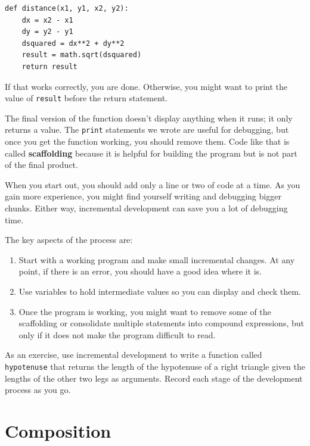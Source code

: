 \documentclass[10pt]{book}
\begin{document}
\begin{verbatim}
def distance(x1, y1, x2, y2):
    dx = x2 - x1
    dy = y2 - y1
    dsquared = dx**2 + dy**2
    result = math.sqrt(dsquared)
    return result
\end{verbatim}
%
If that works correctly, you are done.  Otherwise, you might
want to print the value of {\tt result} before the return
statement.

The final version of the function doesn't display anything when it
runs; it only returns a value.  The {\tt print} statements we wrote
are useful for debugging, but once you get the function working, you
should remove them.  Code like that is called {\bf scaffolding}
because it is helpful for building the program but is not part of the
final product.

When you start out, you should add only a line or two of code at a
time.  As you gain more experience, you might find yourself writing
and debugging bigger chunks.  Either way, incremental development
can save you a lot of debugging time.

The key aspects of the process are:

\begin{enumerate}

\item Start with a working program and make small incremental changes. 
At any point, if there is an error, you should have a good idea
where it is.

\item Use variables to hold intermediate values so you can
display and check them.

\item Once the program is working, you might want to remove some of
the scaffolding or consolidate multiple statements into compound
expressions, but only if it does not make the program difficult to
read.

\end{enumerate}

As an exercise, use incremental development to write a function
called {\tt hypotenuse} that returns the length of the hypotenuse of a
right triangle given the lengths of the other two legs as arguments.
Record each stage of the development process as you go.



\section{Composition}
\end{document}

